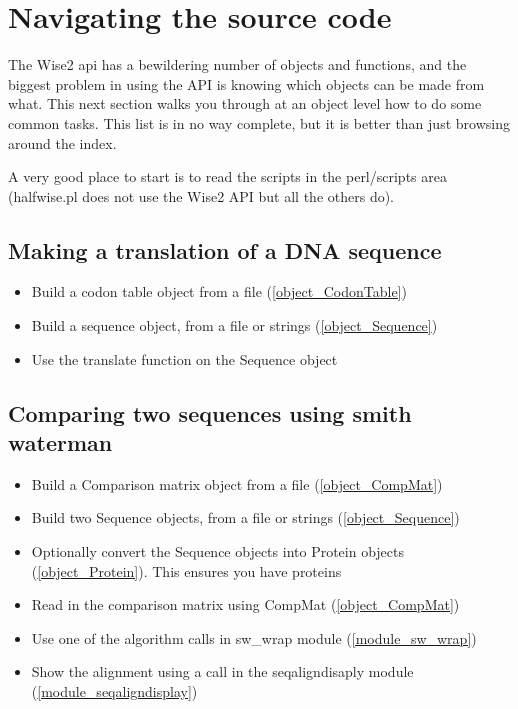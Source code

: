 \section{Navigating the source code}

The Wise2 api has a bewildering number of objects and
functions, and the biggest problem in using the API is
knowing which objects can be made from what. This next
section walks you through at an object level how to
do some common tasks. This list is in no way complete, but
it is better than just browsing around the index.

A very good place to start is to read the scripts in the 
perl/scripts area (halfwise.pl does not use the Wise2 API
but all the others do). 

\subsection{Making a translation of a DNA sequence}
\begin{itemize}
\item Build a codon table object from a file (\ref{object_CodonTable})
\item Build a sequence object, from a file or strings (\ref{object_Sequence})
\item Use the translate function on the Sequence object
\end{itemize}

\subsection{Comparing two sequences using smith waterman}
\begin{itemize}
\item Build a Comparison matrix object from a file (\ref{object_CompMat})
\item Build two Sequence objects, from a file or strings (\ref{object_Sequence})
\item Optionally convert the Sequence objects into Protein objects (\ref{object_Protein}). This ensures you have proteins
\item Read in the comparison matrix using CompMat (\ref{object_CompMat})
\item Use one of the algorithm calls in sw_wrap module (\ref{module_sw_wrap})
\item Show the alignment using a call in the seqaligndisaply module (\ref{module_seqaligndisplay})
\end{itemize}

